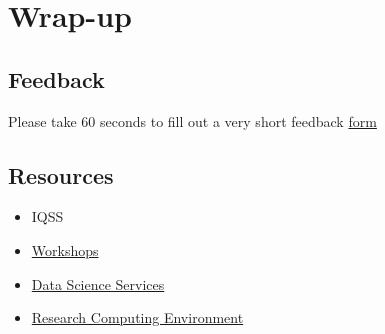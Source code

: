 \documentclass[]{book}
\providecommand{\tightlist}{%
  \setlength{\itemsep}{0pt}\setlength{\parskip}{0pt}}
\begin{document}
\section{Wrap-up}\label{wrap-up-6}

\subsection{Feedback}\label{feedback-6}

Please take 60 seconds to fill out a very short feedback
\href{http://bit.ly/training_class_eval}{form}

\subsection{Resources}\label{resources-6}

\begin{itemize}
\tightlist
\item
  IQSS
\item
  \href{https://dss.iq.harvard.edu/workshop-materials}{Workshops}
\item
  \href{https://dss.iq.harvard.edu/}{Data Science Services}
\item
  \href{https://iqss.github.io/dss-rce/}{Research Computing Environment}
\end{itemize}
\end{document}

